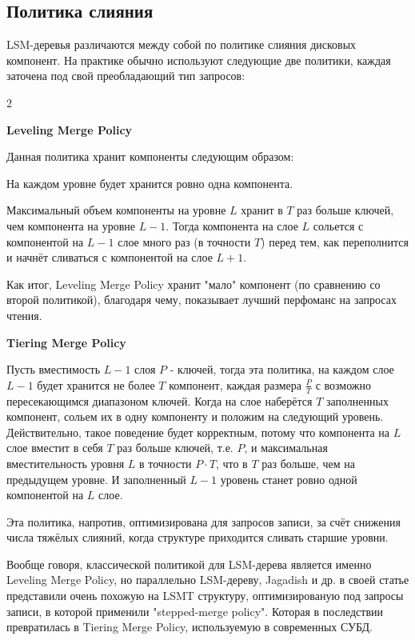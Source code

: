 \subsection{Политика слияния}

LSM-деревья различаются между собой по политике слияния дисковых компонент. \cite{luo2020lsm} На практике обычно используют следующие две политики, каждая заточена под свой преобладающий тип запросов:

\begin{paracol}{2}
  \begin{center}\bfseries Leveling Merge Policy\end{center}

  Данная политика хранит компоненты следующим образом:

  На каждом уровне будет хранится ровно одна компонента.

  Максимальный объем компоненты на уровне $L$ хранит в $T$ раз больше ключей, чем компонента на уровне $L - 1$. Тогда компонента на слое $L$ сольется с компонентой на $L - 1$  слое много раз (в точности $T$) перед тем, как переполнится и начнёт сливаться с компонентой на слое $L + 1$.

  Как итог, Leveling Merge Policy хранит "мало" компонент (по сравнению со второй политикой), благодаря чему, показывает лучший перфоманс на запросах чтения. 

  
\switchcolumn
  \begin{center}\bfseries Tiering Merge Policy\end{center}

  Пусть вместимость $L-1$ слоя $P$ - ключей, тогда
  эта политика, на каждом слое $L - 1$ будет хранится не более $T$ компонент, каждая размера $\frac{P}{T}$ с возможно пересекающимся диапазоном ключей. Когда на слое наберётся $T$ заполненных компонент, сольем их в одну компоненту и положим на следующий уровень. Действительно, такое поведение будет корректным, потому что компонента на $L$ слое вместит в себя $T$ раз больше ключей, т.е. $P$, и максимальная вместительность уровня $L$ в точности $P \cdot T$, что в $T$ раз больше, чем на предыдущем уровне. И заполненный $L-1$ уровень станет ровно одной компонентой на $L$ слое.

  Эта политика, напротив, оптимизирована для запросов записи, за счёт снижения числа тяжёлых слияний, когда структуре приходится сливать старшие уровни.


\end{paracol}



\clearpage
Вообще говоря, классической политикой для LSM-дерева является именно Leveling Merge Policy, но параллельно LSM-дереву,  Jagadish и др. в своей статье \cite{jagadish1997incremental} представили очень похожую на LSMT структуру, оптимизированую под запросы записи, в которой применили "stepped-merge policy". Которая в последствии превратилась в Tiering Merge Policy, используемую в современных СУБД.
